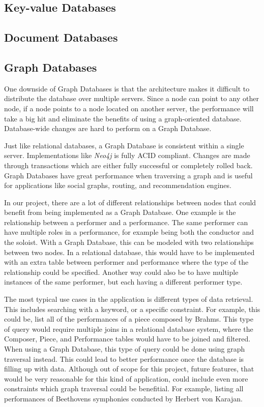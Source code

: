 \subsection{Key-value Databases}
\label{analysis-kv-db}

\subsection{Document Databases}
\label{analysis-doc-db}

\subsection{Graph Databases}
\label{analysis-graph-db}

One downside of Graph Databases is that the architecture makes it difficult to distribute the database over multiple servers. Since a node can point to any other node, if a node points to a node located on another server, the performance will take a big hit and eliminate the benefits of using a graph-oriented database. Database-wide changes are hard to perform on a Graph Database.

Just like relational databases, a Graph Database is consistent within a single server. Implementations like \emph{Neo4j} is fully ACID compliant. Changes are made through transactions which are either fully successful or completely rolled back. Graph Databases have great performance when traversing a graph and is useful for applications like social graphs, routing, and recommendation engines.

In our project, there are a lot of different relationships between nodes that could benefit from being implemented as a Graph Database. One example is the relationship between a performer and a performance. The same performer can have multiple roles in a performance, for example being both the conductor and the soloist. With a Graph Database, this can be modeled with two relationships between two nodes. In a relational database, this would have to be implemented with an extra table between performer and performance where the type of the relationship could be specified. Another way could also be to have multiple instances of the same performer, but each having a different performer type.

The most typical use cases in the application is different types of data retrieval. This includes searching with a keyword, or a specific constraint. For example, this could be, list all of the performances of a piece composed by Brahms. This type of query would require multiple joins in a relational database system, where the Composer, Piece, and Performance tables would have to be joined and filtered. When using a Graph Database, this type of query could be done using graph traversal instead. This could lead to better performance once the database is filling up with data. Although out of scope for this project, future features, that would be very reasonable for this kind of application, could include even more constraints which graph traversal could be benefitial. For example, listing all performances of Beethovens symphonies conducted by Herbert von Karajan.

